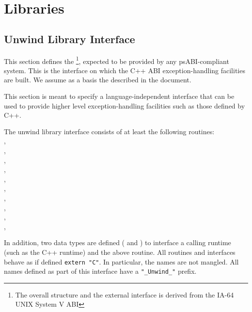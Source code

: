 \chapter{Libraries}

\section{Unwind Library Interface\label{unwindlib}}

This section defines the %
\footnote{The overall structure and the external interface is derived
from the IA-64 UNIX System V ABI},
expected to be provided by any \xARCH psABI-compliant system.
This is the interface on which the C++ ABI exception-handling
facilities are built. We assume as a basis the
 described in the
 document.

This section is meant to specify a language-independent interface that
can be used to provide higher level exception-handling facilities such
as those defined by C++.

The unwind library interface consists of at least the following routines:\\
,\\
,\\
,\\
,\\
,\\
,\\
,\\
,\\
,\\
,\\

\begin{sloppypar}
In addition, two data types are defined (
and ) to interface a calling runtime
(such as the C++ runtime) and the above routine. All routines and
interfaces behave as if defined \texttt{extern "C"}. In particular,
the names are not mangled. All names defined as part of this interface
have a \texttt{"\_Unwind\_"} prefix.
\end{sloppypar}

